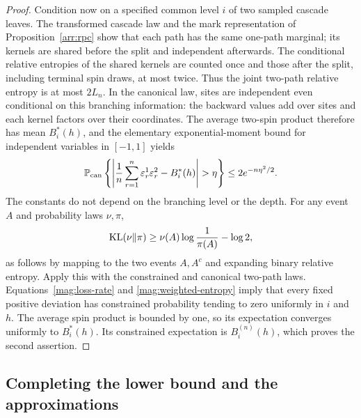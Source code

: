 \begin{proof}
Condition now on a specified common level $i$ of two sampled cascade
leaves. The transformed cascade law and the mark representation of
Proposition~\ref{arr:rpc} show that each path has the same one-path marginal;
its kernels are shared before the split and independent afterwards.
The conditional relative entropies of the shared kernels are counted
once and those after the split, including terminal spin draws, at most
twice. Thus the joint two-path relative entropy is at most $2L_n$.
In the canonical law, sites are independent even conditional on this
branching information: the backward values add over sites and each
kernel factors over their coordinates. The average two-spin product
therefore has mean $B_i^*(h)$, and the elementary exponential-moment bound
for independent variables in $[-1,1]$ yields
\[
 \mathbb P_{\mathrm{can}}\left\{
   \left|\frac1n\sum_{r=1}^n\varepsilon_r^1\varepsilon_r^2-B_i^*(h)\right|
                      >\eta\right\}
     \le2e^{-n\eta^2/2}.
\]
The constants do not depend on the branching level or the depth.
For any event $A$ and probability laws $\nu,\pi$,
\[
 \operatorname{KL}(\nu\Vert\pi)
       \ge\nu(A)\log\frac1{\pi(A)}-\log2,
\]
as follows by mapping to the two events $A,A^c$ and expanding binary
relative entropy. Apply this with the constrained and canonical
two-path laws. Equations~\eqref{mag:loss-rate} and
\eqref{mag:weighted-entropy} imply that every fixed positive deviation
has constrained probability tending to zero uniformly in $i$ and $h$.
The average spin product is bounded by one, so its expectation converges
uniformly to $B_i^*(h)$. Its constrained expectation is $B_i^{(n)}(h)$,
which proves the second assertion.
\end{proof}

\subsection{Completing the lower bound and the approximations}

